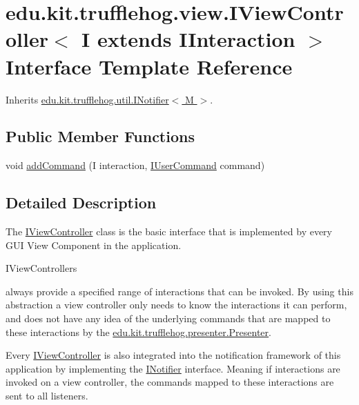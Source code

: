 \hypertarget{interfaceedu_1_1kit_1_1trufflehog_1_1view_1_1_i_view_controller}{}\section{edu.\+kit.\+trufflehog.\+view.\+I\+View\+Controller$<$ I extends I\+Interaction $>$ Interface Template Reference}
\label{interfaceedu_1_1kit_1_1trufflehog_1_1view_1_1_i_view_controller}


Inherits \hyperlink{interfaceedu_1_1kit_1_1trufflehog_1_1util_1_1_i_notifier}{edu.\+kit.\+trufflehog.\+util.\+I\+Notifier$<$ M $>$}.

\subsection*{Public Member Functions}
\begin{DoxyCompactItemize}
\item 
void \hyperlink{interfaceedu_1_1kit_1_1trufflehog_1_1view_1_1_i_view_controller_a07ac3479b2e94987c27be104801fe3a6}{add\+Command} (I interaction, \hyperlink{interfaceedu_1_1kit_1_1trufflehog_1_1command_1_1usercommand_1_1_i_user_command}{I\+User\+Command} command)
\end{DoxyCompactItemize}


\subsection{Detailed Description}
The \hyperlink{interfaceedu_1_1kit_1_1trufflehog_1_1view_1_1_i_view_controller}{I\+View\+Controller} class is the basic interface that is implemented by every G\+U\+I View Component in the application. 


\begin{DoxyCode}
IViewControllers 
\end{DoxyCode}
 always provide a specified range of interactions that can be invoked. By using this abstraction a view controller only needs to know the interactions it can perform, and does not have any idea of the underlying commands that are mapped to these interactions by the \hyperlink{classedu_1_1kit_1_1trufflehog_1_1presenter_1_1_presenter}{edu.\+kit.\+trufflehog.\+presenter.\+Presenter}. 

Every \hyperlink{interfaceedu_1_1kit_1_1trufflehog_1_1view_1_1_i_view_controller}{I\+View\+Controller} is also integrated into the notification framework of this application by implementing the \hyperlink{}{I\+Notifier} interface. Meaning if interactions are invoked on a view controller, the commands mapped to these interactions are sent to all listeners. 


